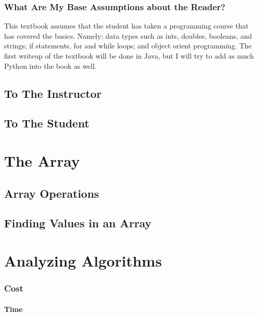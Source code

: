 \documentclass[10pt,a4paper]{book}
\begin{document}
\subsection{What Are My Base Assumptions about the Reader?}

This textbook assumes that the student has taken a programming course that has covered the basics.
Namely: data types such as ints, doubles, booleans, and strings; if statements, for and while loops; and object orient programming.
The first writeup of the textbook will be done in Java, but I will try to add as much Python into the book as well.


\section{To The Instructor}


\section{To The Student}



\chapter{The Array}

\section{Array Operations}

\section{Finding Values in an Array}

\chapter{Analyzing Algorithms}

\subsection{Cost}
\subsubsection{Time}
\end{document}
